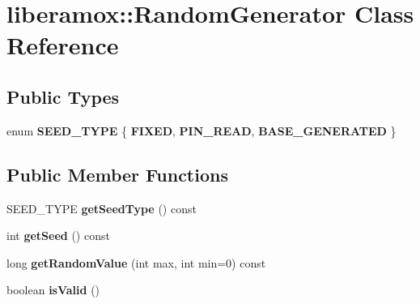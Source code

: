\hypertarget{classliberamox_1_1RandomGenerator}{}\section{liberamox\+:\+:Random\+Generator Class Reference}
\label{classliberamox_1_1RandomGenerator}
\subsection*{Public Types}
\begin{DoxyCompactItemize}
\item 
enum {\bfseries S\+E\+E\+D\+\_\+\+T\+Y\+PE} \{ {\bfseries F\+I\+X\+ED}, 
{\bfseries P\+I\+N\+\_\+\+R\+E\+AD}, 
{\bfseries B\+A\+S\+E\+\_\+\+G\+E\+N\+E\+R\+A\+T\+ED}
 \}\hypertarget{classliberamox_1_1RandomGenerator_ab60a70e0f015b364e905607690cac2d6}{}\label{classliberamox_1_1RandomGenerator_ab60a70e0f015b364e905607690cac2d6}

\end{DoxyCompactItemize}
\subsection*{Public Member Functions}
\begin{DoxyCompactItemize}
\item 
S\+E\+E\+D\+\_\+\+T\+Y\+PE {\bfseries get\+Seed\+Type} () const \hypertarget{classliberamox_1_1RandomGenerator_ab95f5e54da75bee458656c6c9d85033b}{}\label{classliberamox_1_1RandomGenerator_ab95f5e54da75bee458656c6c9d85033b}

\item 
int {\bfseries get\+Seed} () const \hypertarget{classliberamox_1_1RandomGenerator_afed1946628cd976de767ee2b19f5c53f}{}\label{classliberamox_1_1RandomGenerator_afed1946628cd976de767ee2b19f5c53f}

\item 
long {\bfseries get\+Random\+Value} (int max, int min=0) const \hypertarget{classliberamox_1_1RandomGenerator_a97e753a5f24b4be9b83e06ace496f62b}{}\label{classliberamox_1_1RandomGenerator_a97e753a5f24b4be9b83e06ace496f62b}

\item 
boolean {\bfseries is\+Valid} ()\hypertarget{classliberamox_1_1RandomGenerator_acd18f3d3bcdf73afb320858ab6110588}{}\label{classliberamox_1_1RandomGenerator_acd18f3d3bcdf73afb320858ab6110588}

\end{DoxyCompactItemize}
